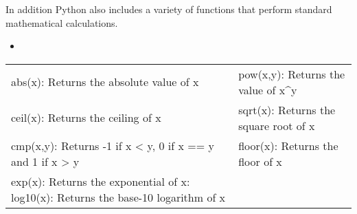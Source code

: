\documentclass[letterpaper,11pt]{article}
\begin{document}
\par{In addition Python also includes a variety of functions that perform
standard mathematical calculations.}
\\
\begin{itemize}
    \item
\end{itemize}
\begin{tabular}[t]{l  l}
    abs(x): Returns the absolute value of x                    & pow(x,y): Returns the value of x^y          \\
    ceil(x): Returns the ceiling of x                          & sqrt(x): Returns the square root of x       \\
    cmp(x,y): Returns -1 if x < y, 0 if x == y and 1 if x > y  & floor(x): Returns the floor of x            \\
    exp(x): Returns the exponential of x: %
    log10(x): Returns the base-10 logarithm of x               &                                             \\
\end{tabular}
\end{document}
